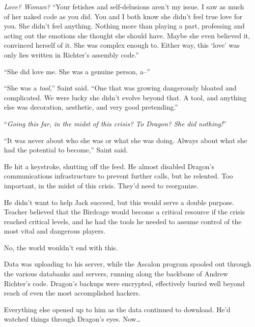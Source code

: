 \emph{Love?  Woman?  }``Your fetishes and self-delusions aren't my issue.  I saw as much of her naked code as you did.  You and I both know she didn't feel true love for you.  She didn't feel anything.  Nothing more than playing a part, professing and acting out the emotions she thought she should have.  Maybe she even believed it, convinced herself of it.  She was complex enough to.  Either way, this `love' was only lies written in Richter's assembly code.''



``She did love me.  She was a genuine person, a--''



``She was a \emph{tool},'' Saint said.  ``One that was growing dangerously bloated and complicated.  We were lucky she didn't evolve beyond that.  A tool, and anything else was decoration, aesthetic, and very good pretending.''



``\emph{Going this far, in the midst of this crisis?  To Dragon?  She did nothing!}''



``It was never about who she was or what she was doing.  Always about what she had the potential to become,'' Saint said.



He hit a keystroke, shutting off the feed.  He almost disabled Dragon's communications infrastructure to prevent further calls, but he relented.  Too important, in the midst of this crisis.  They'd need to reorganize.



He didn't want to help Jack succeed, but this would serve a double purpose.  Teacher believed that the Birdcage would become a critical resource if the crisis reached critical levels, and he had the tools he needed to assume control of the most vital and dangerous players.



No, the world wouldn't end with this.



Data was uploading to his server, while the Ascalon program spooled out through the various databanks and servers, running along the backbone of Andrew Richter's code.  Dragon's backups were encrypted, effectively buried well beyond reach of even the most accomplished hackers.



Everything else opened up to him as the data continued to download.  He'd watched things through Dragon's eyes.  Now\ldots



